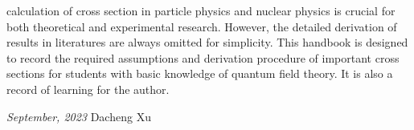  calculation of cross section in particle physics and nuclear physics is crucial for both
theoretical and experimental research. However, the detailed derivation of results in literatures are always omitted for simplicity.
This handbook is designed to record the required assumptions and derivation procedure of important cross sections
for students with basic knowledge of quantum field theory. It is also a record of learning for the author.

\vspace{\baselineskip}

\textit{September, 2023} \hfill Dacheng Xu
